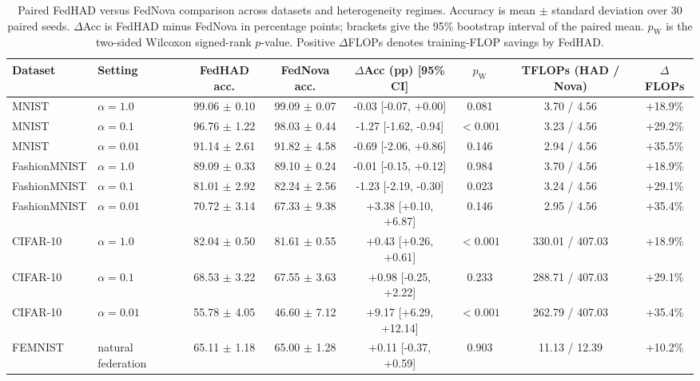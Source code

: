 \begin{table}[t]
\centering
\caption{Paired FedHAD versus FedNova comparison across datasets and heterogeneity regimes. Accuracy is mean $\pm$ standard deviation over 30 paired seeds. $\Delta$Acc is FedHAD minus FedNova in percentage points; brackets give the 95\% bootstrap interval of the paired mean. $p_{\mathrm{W}}$ is the two-sided Wilcoxon signed-rank $p$-value. Positive $\Delta$FLOPs denotes training-FLOP savings by FedHAD.}
\label{tab:fednova_comparison}
\scriptsize
\setlength{\tabcolsep}{3.2pt}
\begin{tabular}{llcccccc}
\toprule
\textbf{Dataset} &
\textbf{Setting} &
\textbf{FedHAD acc.} &
\textbf{FedNova acc.} &
\textbf{$\Delta$Acc (pp) [95\% CI]} &
\textbf{$p_{\mathrm{W}}$} &
\textbf{TFLOPs (HAD / Nova)} &
\textbf{$\Delta$FLOPs} \\
\midrule
MNIST & $\alpha = 1.0$ & 99.06 $\pm$ 0.10 & 99.09 $\pm$ 0.07 & -0.03 [-0.07, +0.00] & 0.081 & 3.70 / 4.56 & +18.9\% \\
MNIST & $\alpha = 0.1$ & 96.76 $\pm$ 1.22 & 98.03 $\pm$ 0.44 & -1.27 [-1.62, -0.94] & $<0.001$ & 3.23 / 4.56 & +29.2\% \\
MNIST & $\alpha = 0.01$ & 91.14 $\pm$ 2.61 & 91.82 $\pm$ 4.58 & -0.69 [-2.06, +0.86] & 0.146 & 2.94 / 4.56 & +35.5\% \\
FashionMNIST & $\alpha = 1.0$ & 89.09 $\pm$ 0.33 & 89.10 $\pm$ 0.24 & -0.01 [-0.15, +0.12] & 0.984 & 3.70 / 4.56 & +18.9\% \\
FashionMNIST & $\alpha = 0.1$ & 81.01 $\pm$ 2.92 & 82.24 $\pm$ 2.56 & -1.23 [-2.19, -0.30] & 0.023 & 3.24 / 4.56 & +29.1\% \\
FashionMNIST & $\alpha = 0.01$ & 70.72 $\pm$ 3.14 & 67.33 $\pm$ 9.38 & +3.38 [+0.10, +6.87] & 0.146 & 2.95 / 4.56 & +35.4\% \\
CIFAR-10 & $\alpha = 1.0$ & 82.04 $\pm$ 0.50 & 81.61 $\pm$ 0.55 & +0.43 [+0.26, +0.61] & $<0.001$ & 330.01 / 407.03 & +18.9\% \\
CIFAR-10 & $\alpha = 0.1$ & 68.53 $\pm$ 3.22 & 67.55 $\pm$ 3.63 & +0.98 [-0.25, +2.22] & 0.233 & 288.71 / 407.03 & +29.1\% \\
CIFAR-10 & $\alpha = 0.01$ & 55.78 $\pm$ 4.05 & 46.60 $\pm$ 7.12 & +9.17 [+6.29, +12.14] & $<0.001$ & 262.79 / 407.03 & +35.4\% \\
FEMNIST & natural federation & 65.11 $\pm$ 1.18 & 65.00 $\pm$ 1.28 & +0.11 [-0.37, +0.59] & 0.903 & 11.13 / 12.39 & +10.2\% \\
\bottomrule
\end{tabular}
\end{table}
